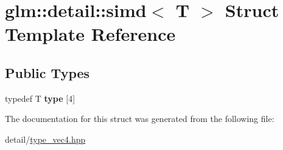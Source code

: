 \hypertarget{structglm_1_1detail_1_1simd}{\section{glm\-:\-:detail\-:\-:simd$<$ T $>$ Struct Template Reference}
\label{structglm_1_1detail_1_1simd}
}
\subsection*{Public Types}
\begin{DoxyCompactItemize}
\item 
\hypertarget{structglm_1_1detail_1_1simd_a7466f2c2e1906934e093d69266bfb1b2}{typedef T {\bfseries type} \mbox{[}4\mbox{]}}\label{structglm_1_1detail_1_1simd_a7466f2c2e1906934e093d69266bfb1b2}

\end{DoxyCompactItemize}


The documentation for this struct was generated from the following file\-:\begin{DoxyCompactItemize}
\item 
detail/\hyperlink{type__vec4_8hpp}{type\-\_\-vec4.\-hpp}\end{DoxyCompactItemize}
